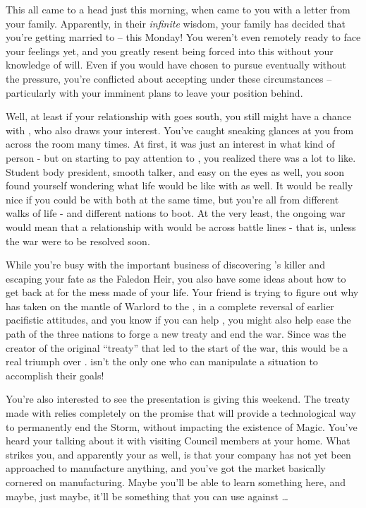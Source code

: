 \documentclass[char]{GL2020}
\begin{document}
This all came to a head just this morning, when \cDiplomat{} came to you with a letter from your family. Apparently, in their \emph{infinite} wisdom, your family has decided that you’re getting married to \cChupStudent{} -- this Monday! You weren’t even remotely ready to face your feelings yet, and you greatly resent being forced into this without your knowledge of will. Even if you would have chosen to pursue \cChupStudent{} eventually without the pressure, you’re conflicted about accepting under these circumstances -- particularly with your imminent plans to leave your position behind.

Well, at least if your relationship with \cChupStudent{} goes south, you still might have a chance with \cPresident{}, who also draws your interest. You’ve caught \cPresident{} sneaking glances at you from across the room many times. At first, it was just an interest in what kind of person \cPresident{\they} \cPresident{\were} - but on starting to pay attention to \cPresident{\them}, you realized there was a lot to like. Student body president, smooth talker, and easy on the eyes as well, you soon found yourself wondering what life would be like with \cPresident{} as well. It would be really nice if you could be with both at the same time, but you’re all from different walks of life - and different nations to boot. At the very least, the ongoing war would mean that a relationship with \cPresident{} would be across battle lines - that is, unless the war were to be resolved soon.

While you’re busy with the important business of discovering \cHeirSibling{}’s killer and escaping your fate as the Faledon Heir, you also have some ideas about how to get back at \cDiplomat{} for the mess \cDiplomat{\they} \cDiplomat{\have} made of your life. Your friend \cWarlordDaughter{} is trying to figure out why \cWarlordDaughter{\their} \cLoud{\parent} has taken on the mantle of Warlord to the \pShippies{}, in a complete reversal of \cLoud{\their} earlier pacifistic attitudes, and you know if you can help \cWarlordDaughter{}, you might also help ease the path of the three nations to forge a new treaty and end the war. Since \cDiplomat{} was the creator of the original ``treaty'' that led to the start of the war, this would be a real triumph over \cDiplomat{\them}. \cDiplomat{} isn’t the only one who can manipulate a situation to accomplish their goals!  

You’re also interested to see the presentation \cHeadScientist{} is giving this weekend.  The treaty \cDiplomat{} made with \pFarm{} relies completely on the promise that \pTech{} will provide a technological way to permanently end the Storm, without impacting the existence of Magic. You’ve heard your \cFaledonParent{\parent} talking about it with visiting Council members at your home.  What strikes you, and apparently your \cFaledonParent{\parent} as well, is that your company has not yet been approached to manufacture anything, and you’ve got the market basically cornered on manufacturing. Maybe you’ll be able to learn something here, and maybe, just maybe, it’ll be something that you can use against \cDiplomat{}\ldots
\end{document}
